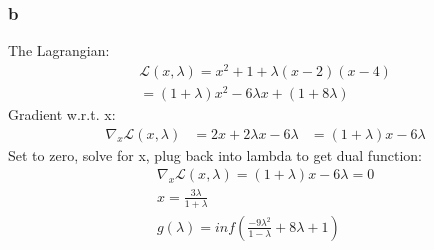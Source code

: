 \documentclass[12pt]{article}
\begin{document}
\subsubsection*{b}
The Lagrangian:\\
\begin{equation*}
\begin{aligned}
& \mathcal{L}(x,\lambda) = x^2 + 1 + \lambda(x-2)(x-4)\\
& = (1 + \lambda)x^2 - 6\lambda x +  (1 + 8\lambda)
\end{aligned}
\end{equation*}
Gradient w.r.t. x:\\
\begin{equation*}
\begin{aligned}
& \nabla_x \mathcal{L}(x,\lambda)
& = 2x + 2\lambda x - 6\lambda
& = (1 + \lambda)x - 6\lambda  
\end{aligned}
\end{equation*}
Set to zero, solve for x, plug back into lambda to get dual function:\\
\begin{equation*}
\begin{aligned}
& \nabla_x \mathcal{L}(x,\lambda) = (1 + \lambda)x - 6\lambda  = 0\\
& x = \frac{3\lambda}{1+\lambda}\\
& g(\lambda) = inf(\frac{-9\lambda^2}{1-\lambda} + 8\lambda + 1)
\end{aligned}
\end{equation*}
\end{document}
